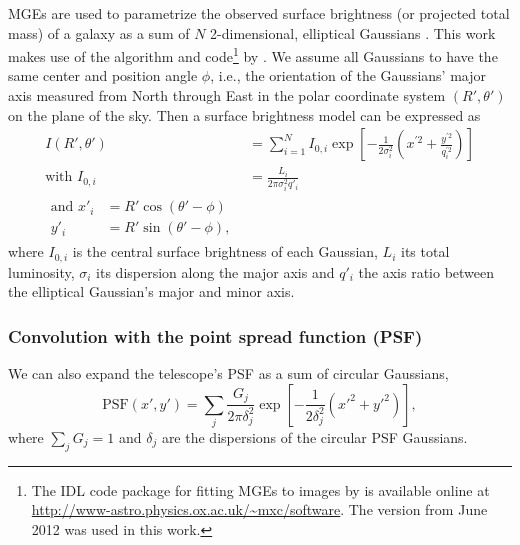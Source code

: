 \documentclass[useAMS,usenatbib]{mnras}
\begin{document}
MGEs are used to parametrize the observed surface brightness (or projected total mass) of a galaxy as a sum of $N$ 2-dimensional, elliptical Gaussians \citep{1991ApJ...366..599B,1992A&A...253..366M,1994A&A...285..723E,1999MNRAS.303..495E}. This work makes use of the algorithm and code\footnote{The IDL code package for fitting MGEs to images by \citet{Cap02} is available online at \url{http://www-astro.physics.ox.ac.uk/~mxc/software}. The version from June 2012 was used in this work.} by \citet{Cap02}. We assume all Gaussians to have the same center and position angle $\phi$, i.e., the orientation of the Gaussians' major axis measured from North through East in the polar coordinate system $(R',\theta')$ on the plane of the sky. Then a surface brightness model can be expressed as
\begin{align}
I(R',\theta') &= \sum_{i=1}^{N} I_{0,i} \exp\left[ - \frac{1}{2\sigma_i^2} \left(x^{'2} + \frac{y^{'2}}{q_i^{'2}}\right)\right]\label{eq:MGEgeneral}\\
\text{with } I_{0,i} &= \frac{L_i}{2\pi \sigma_i^2 q'_i}\label{eq:centralItotalL}\\
\begin{split}
\text{and } x'_i &= R' \cos(\theta' - \phi)\\
y'_i &= R' \sin(\theta' - \phi),
\end{split}
\end{align}
where $I_{0,i}$ is the central surface brightness of each Gaussian, $L_i$ its total luminosity, $\sigma_i$ its dispersion along the major axis and $q'_i$ the axis ratio between the elliptical Gaussian's major and minor axis.

\subsubsection{Convolution with the point spread function (PSF)}

We can also expand the telescope's PSF as a sum of circular Gaussians,
\begin{equation}
\text{PSF}(x',y') = \sum_j \frac{G_j}{2 \pi \delta_j^2} \exp\left[- \frac{1}{2 \delta_j^2} \left({x'}^2 + {y'}^2 \right)\right], \label{eq:PSFgeneral}
\end{equation}
where $\sum_j G_j = 1$ and $\delta_j$ are the dispersions of the circular PSF Gaussians. 
\end{document}
